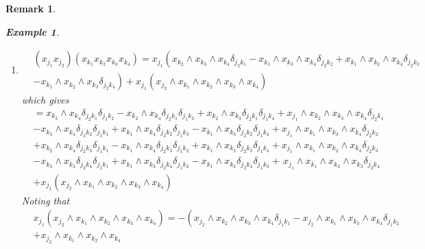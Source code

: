 \documentclass[aps,preprint]{revtex4}%
\newtheorem{example}[theorem]{Example}
\newtheorem{remark}[theorem]{Remark}
\begin{document}
\begin{remark}
\begin{example}
\begin{enumerate}
\item
\begin{align}
&  \left(  x_{j_{1}}x_{j_{2}}\right)  \left(  x_{k_{1}}x_{k_{2}}x_{k_{3}%
}x_{k_{4}}\right)  =x_{j_{1}}\left(  \overset{}{x_{k_{2}}\wedge x_{k_{3}%
}\wedge x_{k_{4}}\delta_{j_{2}k_{1}}-x_{k_{1}}\wedge x_{k_{3}}\wedge x_{k_{4}%
}\delta_{j_{2}k_{2}}+x_{k_{1}}\wedge x_{k_{2}}\wedge x_{k_{4}}\delta
_{j_{2}k_{3}}}\right. \\
&  -\left.  \overset{}{x_{k_{1}}\wedge x_{k_{2}}\wedge x_{k_{3}}\delta
_{j_{2}k_{4}}}\right)  +x_{j_{1}}\left(  x_{j_{2}}\wedge x_{k_{1}}\wedge
x_{k_{2}}\wedge x_{k_{3}}\wedge x_{k_{4}}\right)
\end{align}
which gives
\begin{align}
&  =x_{k_{3}}\wedge x_{k_{4}}\delta_{j_{2}k_{1}}\delta_{j_{1}k_{2}}-x_{k_{2}%
}\wedge x_{k_{4}}\delta_{j_{2}k_{1}}\delta_{j_{1}k_{3}}+x_{k_{2}}\wedge
x_{k_{3}}\delta_{j_{2}k_{1}}\delta_{j_{1}k_{4}}+x_{j_{1}}\wedge x_{k_{2}%
}\wedge x_{k_{3}}\wedge x_{k_{4}}\delta_{j_{2}k_{1}}\\
&  -x_{k_{3}}\wedge x_{k_{4}}\delta_{j_{2}k_{2}}\delta_{j_{1}k_{1}}+x_{k_{1}%
}\wedge x_{k_{4}}\delta_{j_{2}k_{2}}\delta_{j_{1}k_{3}}-x_{k_{1}}\wedge
x_{k_{3}}\delta_{j_{2}k_{2}}\delta_{j_{1}k_{4}}+x_{j_{1}}\wedge x_{k_{1}%
}\wedge x_{k_{3}}\wedge x_{k_{4}}\delta_{j_{2}k_{2}}\\
&  +x_{k_{2}}\wedge x_{k_{4}}\delta_{j_{2}k_{3}}\delta_{j_{1}k_{1}}-x_{k_{1}%
}\wedge x_{k_{4}}\delta_{j_{2}k_{3}}\delta_{j_{1}k_{2}}+x_{k_{1}}\wedge
x_{k_{2}}\delta_{j_{2}k_{3}}\delta_{j_{1}k_{4}}+x_{j_{1}}\wedge x_{k_{1}%
}\wedge x_{k_{2}}\wedge x_{k_{4}}\delta_{j_{2}k_{3}}\\
&  -x_{k_{2}}\wedge x_{k_{3}}\delta_{j_{2}k_{4}}\delta_{j_{1}k_{1}}+x_{k_{1}%
}\wedge x_{k_{3}}\delta_{j_{2}k_{4}}\delta_{j_{1}k_{2}}-x_{k_{1}}\wedge
x_{k_{2}}\delta_{j_{2}k_{4}}\delta_{j_{1}k_{3}}+\,x_{j_{1}}\wedge x_{k_{1}%
}\wedge x_{k_{2}}\wedge x_{k_{3}}\delta_{j_{2}k_{4}}\\
&  +x_{j_{1}}\left(  x_{j_{2}}\wedge x_{k_{1}}\wedge x_{k_{2}}\wedge x_{k_{3}%
}\wedge x_{k_{4}}\right)
\end{align}
Noting that
\begin{align}
&  x_{j_{1}}\left(  x_{j_{2}}\wedge x_{k_{1}}\wedge x_{k_{2}}\wedge x_{k_{3}%
}\wedge x_{k_{4}}\right)  =-\left(  x_{j_{2}}\wedge x_{k_{2}}\wedge x_{k_{3}%
}\wedge x_{k_{4}}\delta_{j_{1}k_{1}}-x_{j_{2}}\wedge x_{k_{1}}\wedge x_{k_{3}%
}\wedge x_{k_{4}}\delta_{j_{1}k_{2}}\right. \\
&  \left.  +x_{j_{2}}\wedge x_{k_{1}}\wedge x_{k_{2}}\wedge x_{k_{4}}%

\end{align}
\end{enumerate}
\end{example}
\end{remark}
\end{document}
